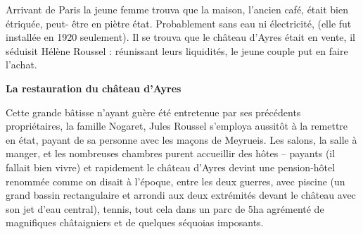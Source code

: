 \medskip

Arrivant de Paris la jeune femme trouva que la maison, l’ancien café, était bien étriquée, peut-
être en piètre état. Probablement sans eau ni électricité, (elle fut installée en 1920 seulement).
Il se trouva que le château d’Ayres était en vente, il séduisit Hélène Roussel : réunissant leurs
liquidités, le jeune couple put en faire l’achat.

\medskip

\textbf{La restauration du château d’Ayres}

\medskip

Cette grande bâtisse n’ayant guère été entretenue par ses précédents propriétaires, la famille
Nogaret, Jules Roussel s’employa aussitôt à la remettre en état, payant de sa personne avec
les maçons de Meyrueis. Les salons, la salle à manger, et les nombreuses chambres purent
accueillir des hôtes – payants (il fallait bien vivre) et rapidement le château d’Ayres devint
une pension-hôtel renommée comme on disait à l’époque, entre les deux guerres, avec
piscine (un grand bassin rectangulaire et arrondi aux deux extrémités devant le château avec
son jet d’eau central), tennis, tout cela dans un parc de 5ha agrémenté de magnifiques
châtaigniers et de quelques séquoias imposants.

